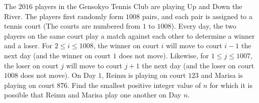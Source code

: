 The $2016$ players in the Gensokyo Tennis Club are playing Up and Down the River. The players first randomly form $1008$ pairs, and each pair is assigned to a tennis court (The courts are numbered from $1$ to $1008$). Every day, the two players on the same court play a match against each other to determine a winner and a loser. For $2\le i\le 1008$, the winner on court $i$ will move to court $i-1$ the next day (and the winner on court $1$ does not move). Likewise, for $1\le j\le 1007$, the loser on court $j$ will move to court $j+1$ the next day (and the loser on court $1008$ does not move). On Day $1$, Reimu is playing on court $123$ and Marisa is playing on court $876$. Find the smallest positive integer value of $n$ for which it is possible that Reimu and Marisa play one another on Day $n$.
